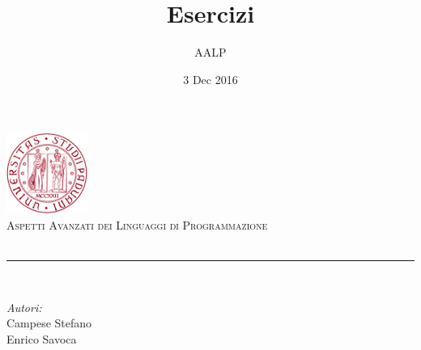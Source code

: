 \documentclass[12pt]{article}
\title{Esercizi}                                %
\author{AALP}                               %
\date{3 Dec 2016}                                         %
\makeatletter
\let\thetitle\@title
\makeatother
\begin{document}

\begin{titlepage}
    \centering
    \vspace*{0.5 cm}
    \includegraphics[scale = 0.75]{logo.png}\\[1.0 cm]  %
    \textsc{\LARGE Aspetti Avanzati dei Linguaggi \newline\newline di Programmazione}\\[2.0 cm]  %
    { \huge \bfseries \thetitle}\\
    \rule{\linewidth}{0.2 mm} \\[1.5 cm]
    
    \begin{minipage}{0.4\textwidth}
        \begin{flushleft} \large
            \emph{Autori:}\\
            Campese Stefano\\
            Enrico Savoca\\
        \end{flushleft}
    \end{minipage}~
    
    
    
    
    
    
    
\end{titlepage}


\tableofcontents
\pagebreak

  





\newpage


\end{document}
